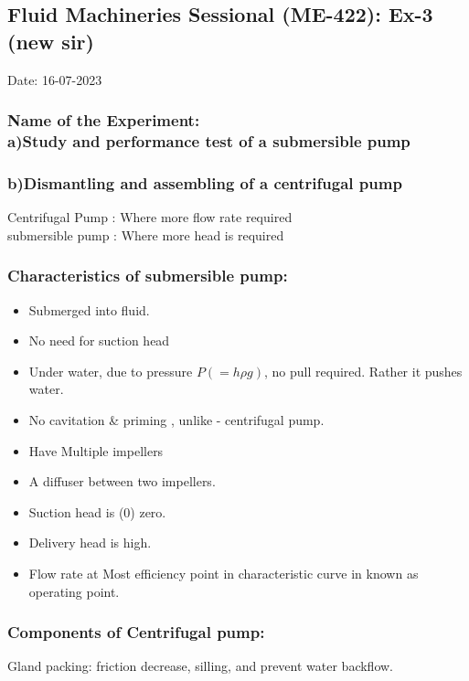 \documentclass[12pt]{article}
\begin{document}
\subsection*{Fluid Machineries Sessional (ME-422): Ex-3 (new sir)}
\hfill Date: 16-07-2023 
\subsubsection*{Name of the Experiment: \\a)Study and performance test of a submersible pump} 
\subsubsection*{b)Dismantling and assembling of a centrifugal pump} 
\vspace*{1cm}

    Centrifugal Pump : Where more flow rate required \\
    submersible pump : Where more head is required \\

    \subsubsection*{Characteristics of submersible pump:}
    \begin{itemize}
        \item Submerged into fluid. 
        \item No need for suction head 
        \item Under water, due to pressure $P (=h\rho g)$, no pull required. Rather it pushes water.
        \item No cavitation \& priming , unlike - centrifugal pump.
        \item Have Multiple impellers 
        \item A diffuser between two impellers. 
        \item Suction head is (0) zero. 
        \item Delivery head is high.     
        \item Flow rate at Most efficiency point in characteristic curve in known as operating point. 
    \end{itemize}

    \subsubsection*{Components of Centrifugal pump:}
    Gland packing: friction decrease, silling, and prevent water backflow.
\end{document}
